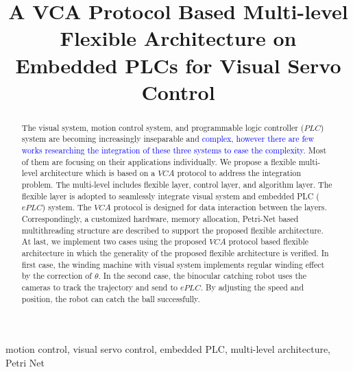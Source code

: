 \documentclass[journal,UTF8]{IEEEtran}
\begin{document}
%
\title{A VCA Protocol Based Multi-level Flexible Architecture on Embedded PLCs for Visual Servo Control }

\maketitle

\begin{abstract}
The visual system, motion control system, and programmable logic controller ($PLC$) system are becoming increasingly inseparable and \textcolor{blue}{complex, however there are few works researching the integration of these three systems to ease the complexity.} Most of them are focusing on their applications individually. We propose a flexible multi-level architecture which is based on a $VCA$ protocol to address the integration problem. The multi-level includes flexible layer, control layer, and algorithm layer. The flexible layer is adopted to seamlessly integrate visual system and embedded PLC ($ePLC$) system. The $VCA$ protocol is designed for data interaction between the layers. Correspondingly, a customized hardware, memory allocation, Petri-Net based multithreading structure are described to support the proposed flexible architecture. At last, we implement two cases using the proposed $VCA$ protocol based flexible architecture in which the generality of the proposed flexible architecture is verified. In first case, the winding machine with visual system implements regular winding effect by the correction of $\theta$. In the second case, the binocular catching robot uses the cameras to track the trajectory and send to $ePLC$. By adjusting the speed and position, the robot can catch the ball successfully.
\end{abstract}

\begin{IEEEkeywords}
motion control, visual servo control, embedded PLC, multi-level architecture, Petri Net
\end{IEEEkeywords}

%
\IEEEpeerreviewmaketitle
\end{document}
